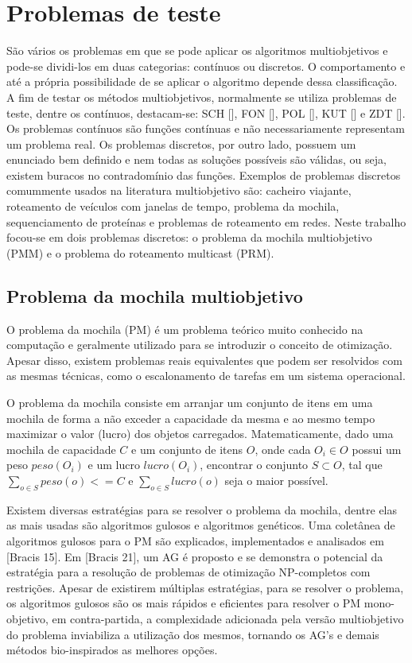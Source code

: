 \chapter[Problemas de teste]{Problemas de teste}

São vários os problemas em que se pode aplicar os algoritmos multiobjetivos e pode-se dividi-los em duas categorias: contínuos ou discretos. O comportamento e até a própria possibilidade de se aplicar o algoritmo depende dessa classificação. A fim de testar os métodos multiobjetivos, normalmente se utiliza problemas de teste, dentre os contínuos, destacam-se: SCH [], FON [], POL [], KUT [] e ZDT []. Os problemas contínuos são funções contínuas e não necessariamente representam um problema real. Os problemas discretos, por outro lado, possuem um enunciado bem definido e nem todas as soluções possíveis são válidas, ou seja, existem buracos no contradomínio das funções. Exemplos de problemas discretos comummente usados na literatura multiobjetivo são: cacheiro viajante, roteamento de veículos com janelas de tempo, problema da mochila, sequenciamento de proteínas e problemas de roteamento em redes. Neste trabalho focou-se em dois problemas discretos: o problema da mochila multiobjetivo (PMM) e o problema do roteamento multicast (PRM).

\section{Problema da mochila multiobjetivo}

O problema da mochila (PM) é um problema teórico muito conhecido na computação e geralmente utilizado para se introduzir o conceito de otimização. Apesar disso, existem problemas reais equivalentes que podem ser resolvidos com as mesmas técnicas, como o escalonamento de tarefas em um sistema operacional.

O problema da mochila consiste em arranjar um conjunto de itens em uma mochila de forma a não exceder a capacidade da mesma e ao mesmo tempo maximizar o valor (lucro) dos objetos carregados. Matematicamente, dado uma mochila de capacidade $C$ e um conjunto de itens $O$, onde cada $O_i \in O$ possui um peso $peso(O_i)$ e um lucro $lucro(O_i)$, encontrar o conjunto $S \subset O$, tal que $\sum_{o \in S} peso(o) <= C$ e $\sum_{o \in S} lucro(o)$ seja o maior possível.

Existem diversas estratégias para se resolver o problema da mochila, dentre elas as mais usadas são algoritmos gulosos e algoritmos genéticos. Uma coletânea de algoritmos gulosos para o PM são explicados, implementados e analisados em [Bracis 15].  Em [Bracis 21], um AG é proposto e se demonstra o potencial da estratégia para a resolução de problemas de otimização NP-completos com restrições. Apesar de existirem múltiplas estratégias, para se resolver o problema, os algoritmos gulosos são os mais rápidos e eficientes para resolver o PM mono-objetivo, em contra-partida, a complexidade adicionada pela versão multiobjetivo do problema inviabiliza a utilização dos mesmos, tornando os AG's e demais métodos bio-inspirados as melhores opções.

